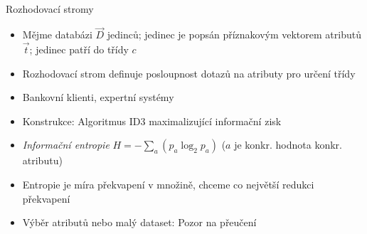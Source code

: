 \documentclass{beamer}
\begin{document}
\subsection{}

\subsection{}
\begin{frame}{Rozhodovací stromy}
\begin{itemize}
\item Mějme databázi $\vec D$ jedinců; jedinec je popsán příznakovým vektorem atributů $\vec t$; jedinec patří do třídy $c$
\item Rozhodovací strom definuje posloupnost dotazů na atributy pro určení třídy
\item Bankovní klienti, expertní systémy
\item Konstrukce: Algoritmus ID3 maximalizující informační zisk
\item {\em Informační entropie} $H = -\sum_a (p_a \log_2 p_a)$ ($a$ je konkr. hodnota konkr. atributu)
\item Entropie je míra překvapení v množině, chceme co největší redukci překvapení
\item Výběr atributů nebo malý dataset: Pozor na přeučení
\end{itemize}
\end{frame}
\end{document}
